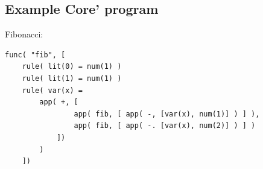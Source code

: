 \subsection{Example Core' program}

Fibonacci:

\begin{lstlisting}
func( "fib", [
	rule( lit(0) = num(1) )
	rule( lit(1) = num(1) )
	rule( var(x) = 
		app( +, [
				app( fib, [ app( -, [var(x), num(1)] ) ] ), 
				app( fib, [ app( -. [var(x), num(2)] ) ] )
			])
		)
	])
\end{lstlisting}

